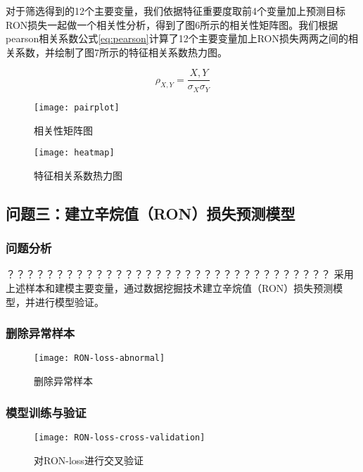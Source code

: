 \documentclass[bwprint]{gmcmthesis}
\begin{document}
对于筛选得到的12个主要变量，我们依据特征重要度取前4个变量加上预测目标RON损失一起做一个相关性分析，得到了图6所示的相关性矩阵图。我们根据pearson相关系数公式\eqref{eq:pearson}计算了12个主要变量加上RON损失两两之间的相关系数，并绘制了图7所示的特征相关系数热力图。

\begin{equation}\label{eq:pearson}
	\rho_{X,Y}=\frac{X,Y}{\sigma_X\sigma_Y}
\end{equation}


\begin{figure}[htb]
	\centering
	\texttt{[image: pairplot]}
	\caption{相关性矩阵图}
\end{figure}

\begin{figure}[htb]
	\centering
	\texttt{[image: heatmap]}
	\caption{特征相关系数热力图}
\end{figure}


\FloatBarrier
\subsection{问题三：建立辛烷值（RON）损失预测模型}\label{sec:modeling}

\FloatBarrier
\subsubsection{问题分析}

？？？？？？？？？？？？？？？？？？？？？？？？？？？？？？？？？
采用上述样本和建模主要变量，通过数据挖掘技术建立辛烷值（RON）损失预测模型，并进行模型验证。 


\FloatBarrier
\subsubsection{删除异常样本}

\begin{figure}[htb]
	\centering
	\texttt{[image: RON-loss-abnormal]}
	\caption{删除异常样本}
\end{figure}

\FloatBarrier
\subsubsection{模型训练与验证}

\begin{figure}[htb]
	\centering
	\texttt{[image: RON-loss-cross-validation]}
	\caption{对RON-loss进行交叉验证}
\end{figure}
\end{document}
